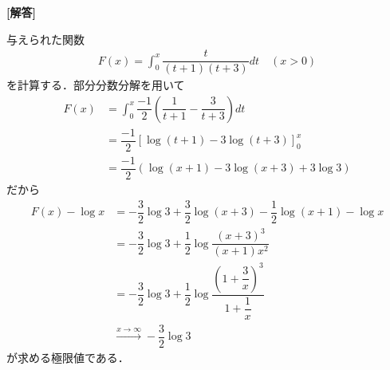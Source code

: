 \documentclass[../../main.tex]{subfiles}
\begin{document}
\begin{oframed}
  
\end{oframed}

{\bf [解答]}

与えられた関数
\begin{align}
  F(x)=\int_0^x\dfrac{t}{(t+1)(t+3)}dt \quad (x>0)
\end{align}
を計算する．部分分数分解を用いて
\begin{align}
  F(x)
  &= \int_0^x \dfrac{-1}{2}\left( \dfrac{1}{t+1} - \dfrac{3}{t+3} \right) dt \\
  &= \dfrac{-1}{2} \left[ \log(t+1) - 3\log(t+3) \right]_0^x \\
  &= \dfrac{-1}{2} \left( \log(x+1) - 3\log(x+3) + 3\log 3 \right)
\end{align}
だから
\begin{align}
  F(x) - \log x &= -\dfrac{3}{2}\log 3 + \dfrac{3}{2}\log(x+3) - \dfrac{1}{2}\log(x+1) - \log x \\
  &= -\dfrac{3}{2}\log 3 + \dfrac{1}{2}\log \dfrac{(x+3)^3}{(x+1)x^2} \\
  &= -\dfrac{3}{2}\log 3 + \dfrac{1}{2}\log \dfrac{(1 + \dfrac{3}{x})^3}{1 + \dfrac{1}{x}} \\
  &\xrightarrow{x\to\infty} -\dfrac{3}{2}\log 3
\end{align}
が求める極限値である．

\newpage
\end{document}
